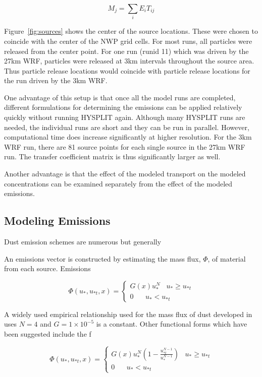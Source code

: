 $$M_j = \sum_{i} E_i T_{ij} $$

Figure~\ref{fig:sources} shows the center of the source locations. These were chosen to coincide with the center of the NWP grid cells. For most runs, all particles
were released from the center point. For one run (runid 11) which was driven by the 27km WRF, particles were released at 3km intervals throughout the source area. Thus particle
release locations would coincide with particle release locations for the run driven by the 3km WRF.

One advantage of this setup is that once all the model runs are completed, different formulations for determining the emissions can
be applied relatively quickly without running HYSPLIT again. 
Although many HYSPLIT runs are needed, the individual runs are short and they can be run in parallel. However, computational time does
increase significantly at higher resolution. For the 3km WRF run, there are 81 source points for each single source in the 27km WRF run.
The transfer coefficient matrix is thus significantly larger as well.

Another advantage is that the effect of the modeled transport on the modeled concentrations can be examined separately from
the effect of the modeled emissions.   



\subsection{Modeling Emissions}

Dust emission schemes are numerous but generally 

An emissions vector  is constructed by estimating the mass flux, $\Phi$, of material from each source.
Emissions 

\begin{equation}
\Phi(u_*, u_{*t},x) =\begin{cases}
G(x)u_*^N \;\;\; u_{*} \geq u_{*t} \\
0 \;\;\;\;\;\;  u_* < u_{*t} 
\end{cases}
\label{eq:massflux}
\end{equation}

A widely used empirical relationship used for the mass flux of dust developed in ~\citep{westphal}  
uses $N=4$ and $G=1\times10^{-5}$ is a constant. Other functional forms which have been suggested include the f

\begin{equation}
\Phi(u_*, u_{*t},x) =\begin{cases}
G(x)u_*^N (1-\frac{u_{*t}^{N-1}}{u_{*}^{N-1}})  \;\;\; u_{*} \geq u_{*t} \\
0 \;\;\;\;\;\;  u_* < u_{*t} 
\end{cases}
\label{eq:shao}
\end{equation}


